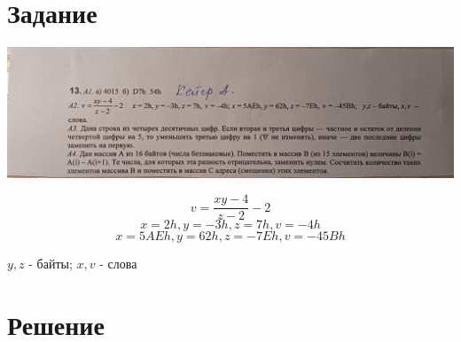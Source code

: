 \documentclass[12pt]{article}
\begin{document}
	
	\section*{Задание}
	
	\includegraphics[width=400pt]{variant_13.jpg}
	
	$$v = \frac{xy - 4}{z - 2} - 2$$
	$$x = 2h, y = -3h, z = 7h, v = -4h$$
	$$x = 5AEh, y = 62h, z = -7Eh, v = -45Bh$$
	\begin{center}
		$y, z$ - байты; $x, v$ - слова
	\end{center}
	
	\newpage
	
	
	\section*{Решение}
	
\end{document}
